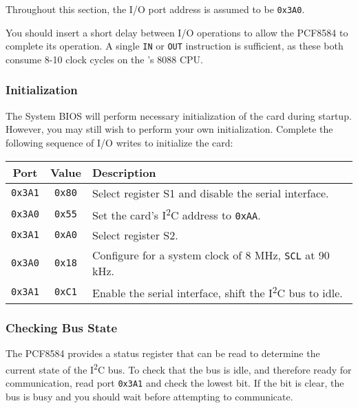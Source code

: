 \documentclass[twoside,10pt,letterpaper]{refart}
\newcommand{\itwoc}{I\textsuperscript{2}C}
\begin{document}
Throughout this section, the I/O port address is assumed to be \texttt{0x3A0}.

You should insert a short delay between I/O operations to allow the PCF8584 to complete its operation. A single
\texttt{IN} or \texttt{OUT} instruction is sufficient, as these both consume 8-10 clock cycles on the 's 8088
CPU.

\subsubsection{Initialization}
The  System BIOS will perform necessary initialization of the card during startup.
However, you may still wish to perform your own initialization. Complete the following sequence of I/O writes
to initialize the card:

\begin{center}
    \begin{tabular}{ c|c|l }
        \textbf{Port} & \textbf{Value} & \textbf{Description} \\
        \hline
        \texttt{0x3A1} & \texttt{0x80} & Select register S1 and disable the serial interface. \\
        \texttt{0x3A0} & \texttt{0x55} & Set the card's \itwoc{} address to \texttt{0xAA}. \\
        \texttt{0x3A1} & \texttt{0xA0} & Select register S2. \\
        \texttt{0x3A0} & \texttt{0x18} & Configure for a system clock of 8 MHz\footnotemark, \texttt{SCL} at 90 kHz. \\
        \texttt{0x3A1} & \texttt{0xC1} & Enable the serial interface, shift the \itwoc{} bus to idle. \\
    \end{tabular}
\end{center}


\subsubsection{Checking Bus State} \label{i2cbridge:busstate}
The PCF8584 provides a status register that can be read to determine the current state of the \itwoc{} bus.
To check that the bus is idle, and therefore ready for communication, read port \texttt{0x3A1} and check
the lowest bit. If the bit is clear, the bus is busy and you should wait before attempting to communicate.
\end{document}
